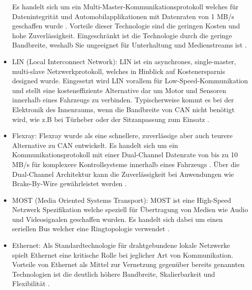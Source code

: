 \begin{itemize}
                Es handelt sich um ein Multi-Master-Kommunikationsprotokoll welches für Datenintegrität und Automobilapplikationen mit Datenraten von 1 MB/s geschaffen wurde \cite{wolf2004security}. Vorteile
                dieser Technologie sind die geringen Kosten und hohe Zuverlässigkeit. Eingeschränkt ist die Technologie durch die geringe Bandbreite, weshalb Sie
                ungeeignet für Unterhaltung und Medienstreams ist \cite{TW_huang2018vehicle}.
                \item LIN (Local Interconnect Network): LIN ist ein asynchrones, single-master, multi-slave Netzwerkprotokoll, welches in Hinblick auf Kostenersparnis 
                designed wurde. Eingesetzt wird LIN vorallem für Low-Speed-Kommunikation und stellt eine kosteneffiziente Alternative dar um Motor und Sensoren innerhalb 
                eines Fahrzeugs zu verbinden. Typischerweise kommt es bei der Elektronik des Innenraums, wenn die Bandbreite von CAN nicht benötigt wird, wie z.B bei Türheber
                oder der Sitzanpassung zum Einsatz \cite{TW_huang2018vehicle}.
                \item Flexray: Flexray wurde als eine schnellere, zuverlässige aber auch teurere Alternative zu CAN entwickelt. Es handelt sich um ein Kommunikationsprotokoll mit einer
                Dual-Channel Datenrate von bis zu 10 MB/s für komplexere Kontrollsysteme innerhalb eines Fahrzeugs \cite{wolf2004security}. Über die Dual-Channel Architektur kann die Zuverlässigkeit
                bei Anwendungen wie Brake-By-Wire gewährleistet werden \cite{TW_huang2018vehicle}. 
                \item MOST (Media Oriented Systems Transport): MOST ist eine High-Speed Netzwerk Spezifikation welche speziell für Übertragung von Medien wie Audio und Videosignalen 
                geschaffen wurden. Es handelt sich dabei um einen seriellen Bus welcher eine Ringtopologie verwendet \cite{TW_huang2018vehicle}.
                \item Ethernet: Als Standardtechnologie für drahtgebundene lokale Netzwerke spielt Ethernet eine kritische Rolle bei jeglicher Art von Kommunikation.
                Vorteile von Ethernet als Mittel zur Vernetzung gegenüber bereits genannten Technologien ist die deutlich höhere Bandbreite, Skalierbarkeit und Flexibilität \cite{hank2013automotive}\cite{TW_huang2018vehicle}. 
            \end{itemize}
